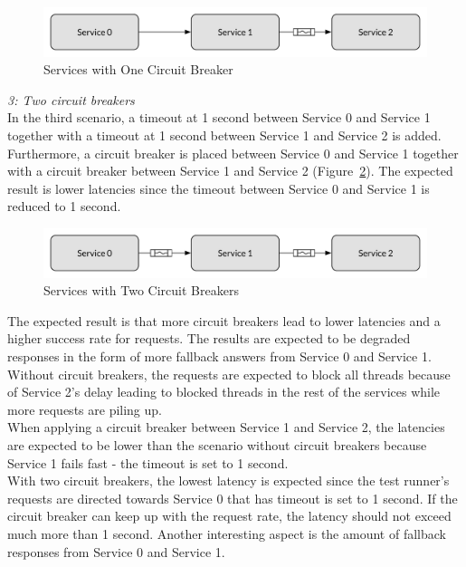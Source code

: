 \begin{figure}[H]
\centering
\includegraphics[scale=0.5]{figures/one_circuit_breaker_3_services}
\caption{Services with One Circuit Breaker}
\label{fig:exp2_one_circuit_breaker}
\end{figure}

\noindent
\textit{3: Two circuit breakers}
\\
In the third scenario, a timeout at 1 second between Service 0 and Service 1 together with a timeout at 1 second between Service 1 and Service 2 is added. Furthermore, a circuit breaker is placed between Service 0 and Service 1 together with a circuit breaker between Service 1 and Service 2 (Figure~\ref{fig:exp2_circuit_breaker}). The expected result is lower latencies since the timeout between Service 0 and Service 1 is reduced to 1 second.

\begin{figure}[H]
\centering
\includegraphics[scale=0.5]{figures/circuit_breaker_3_services}
\caption{Services with Two Circuit Breakers}
\label{fig:exp2_circuit_breaker}
\end{figure}


\noindent The expected result is that more circuit breakers lead to lower latencies and a higher success rate for requests. The results are expected to be degraded responses in the form of more fallback answers from Service 0 and Service 1. \\

\noindent Without circuit breakers, the requests are expected to block all threads because of Service 2's delay leading to blocked threads in the rest of the services while more requests are piling up. \\

\noindent 
When applying a circuit breaker between Service 1 and Service 2, the latencies are expected to be lower than the scenario without circuit breakers because Service 1 fails fast - the timeout is set to 1 second. \\

\noindent 
With two circuit breakers, the lowest latency is expected since the test runner's requests are directed towards Service 0 that has timeout is set to 1 second. If the circuit breaker can keep up with the request rate, the latency should not exceed much more than 1 second. Another interesting aspect is the amount of fallback responses from Service 0 and Service 1. \\


